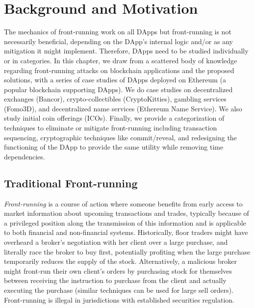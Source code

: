 \section{Background and Motivation}

The mechanics of front-running work on all DApps but front-running is not necessarily beneficial, depending on the DApp's internal logic and/or as any mitigation it might implement. Therefore, DApps need to be studied individually or in categories. In this chapter, we draw from a scattered body of knowledge regarding front-running attacks on blockchain applications and the proposed solutions, with a series of case studies of DApps deployed on Ethereum (a popular blockchain supporting DApps). We do case studies on decentralized exchanges (\eg Bancor), crypto-collectibles (\eg CryptoKitties), gambling services (\eg Fomo3D), and decentralized name services (\eg Ethereum Name Service). We also study initial coin offerings (ICOs). Finally, we provide a categorization of techniques to eliminate or mitigate front-running including transaction sequencing, cryptographic techniques like commit/reveal, and redesigning the functioning of the DApp to provide the same utility while removing time dependencies.




\subsection{Traditional Front-running}
\label{sec:What is front-running?}

\emph{Front-running} is a course of action where someone benefits from early access to market information about upcoming transactions and trades, typically because of a privileged position along the transmission of this information and is applicable to both financial and non-financial systems. Historically, floor traders might have overheard a broker's negotiation with her client over a large purchase, and literally race the broker to buy first, potentially profiting when the large purchase temporarily reduces the supply of the stock. Alternatively, a malicious broker might front-run their own client's orders by purchasing stock for themselves between receiving the instruction to purchase from the client and actually executing the purchase (similar techniques can be used for large sell orders). Front-running is illegal in jurisdictions with established securities regulation.

